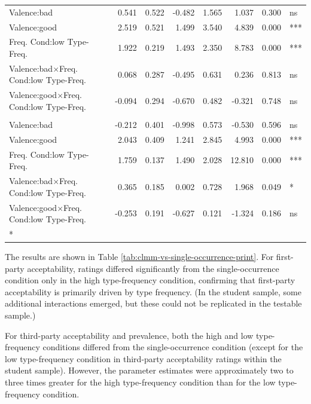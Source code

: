 \documentclass[
]{article}
\begin{document}
\begin{longtable}[t]{lrrrrrrl}
\hspace{1em}Valence:bad & 0.541 & 0.522 & -0.482 & 1.565 & 1.037 & 0.300 & ns\\
\hspace{1em}Valence:good & 2.519 & 0.521 & 1.499 & 3.540 & 4.839 & 0.000 & ***\\
Freq.
Cond:low
\hspace{1em}Type-Freq. & 1.922 & 0.219 & 1.493 & 2.350 & 8.783 & 0.000 & ***\\
Valence:bad$\times$Freq.
Cond:low
\hspace{1em}Type-Freq. & 0.068 & 0.287 & -0.495 & 0.631 & 0.236 & 0.813 & ns\\
Valence:good$\times$Freq.
Cond:low
\hspace{1em}Type-Freq. & -0.094 & 0.294 & -0.670 & 0.482 & -0.321 & 0.748 & ns\\
\addlinespace[0.3em]
\multicolumn{8}{l}{\textbf{Prevalence - Low Type-Frequency (vs. Single Occurrence) - Testable}}\\
\hspace{1em}Valence:bad & -0.212 & 0.401 & -0.998 & 0.573 & -0.530 & 0.596 & ns\\
\hspace{1em}Valence:good & 2.043 & 0.409 & 1.241 & 2.845 & 4.993 & 0.000 & ***\\
Freq.
Cond:low
\hspace{1em}Type-Freq. & 1.759 & 0.137 & 1.490 & 2.028 & 12.810 & 0.000 & ***\\
Valence:bad$\times$Freq.
Cond:low
\hspace{1em}Type-Freq. & 0.365 & 0.185 & 0.002 & 0.728 & 1.968 & 0.049 & *\\
Valence:good$\times$Freq.
Cond:low
\hspace{1em}Type-Freq. & -0.253 & 0.191 & -0.627 & 0.121 & -1.324 & 0.186 & ns\\*
\end{longtable}

The results are shown in Table \ref{tab:clmm-vs-single-occurrence-print}. For first-party acceptability, ratings differed significantly from the single-occurrence condition only in the high type-frequency condition, confirming that first-party acceptability is primarily driven by type frequency. (In the student sample, some additional interactions emerged, but these could not be replicated in the testable sample.)

For third-party acceptability and prevalence, both the high and low type-frequency conditions differed from the single-occurrence condition (except for the low type-frequency condition in third-party acceptability ratings within the student sample). However, the parameter estimates were approximately two to three times greater for the high type-frequency condition than for the low type-frequency condition.
\end{document}
